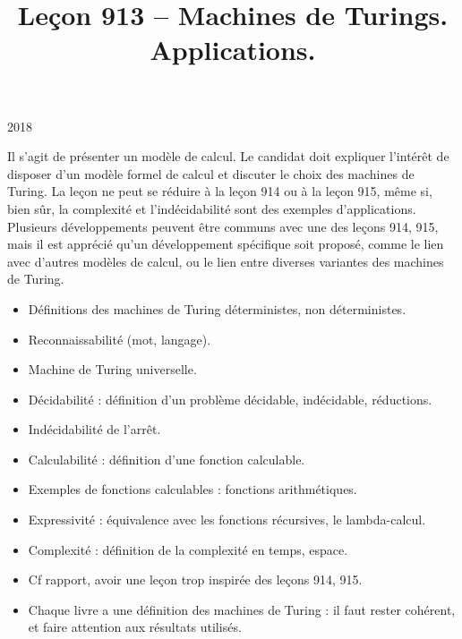 \documentclass{agregfiche}
\title{Leçon 913 -- Machines de Turings. Applications.}
\begin{document}
\maketitle

\secrapports

\begin{rapport}{2018}

Il s'agit de présenter un modèle de calcul.
Le candidat doit expliquer l'intérêt de disposer d'un modèle formel de calcul et discuter le choix des machines de Turing.
La leçon ne peut se réduire à la leçon 914 ou à la leçon 915, même si, bien sûr, la complexité et l'indécidabilité sont des exemples d'applications.
Plusieurs développements peuvent être communs avec une des leçons 914, 915, mais il est apprécié qu'un développement spécifique soit proposé, comme le lien avec d'autres modèles de calcul, ou le lien entre diverses variantes des machines de Turing.

\end{rapport}

\secindispensables

\begin{itemize}
    \item Définitions des machines de Turing déterministes, non déterministes.
    \item Reconnaissabilité (mot, langage).
    \item Machine de Turing universelle.
    \item Décidabilité : définition d'un problème décidable, indécidable, réductions.
    \item Indécidabilité de l'arrêt.
    \item Calculabilité : définition d'une fonction calculable.
    \item Exemples de fonctions calculables : fonctions arithmétiques.
    \item Expressivité : équivalence avec les fonctions récursives, le lambda-calcul.
    \item Complexité : définition de la complexité en temps, espace.
\end{itemize}

\secpieges

\begin{itemize}
    \item Cf rapport, avoir une leçon trop inspirée des leçons 914, 915.
    \item Chaque livre a une définition des machines de Turing : il faut rester cohérent, et faire attention aux résultats utilisés.
\end{itemize}
\end{document}
